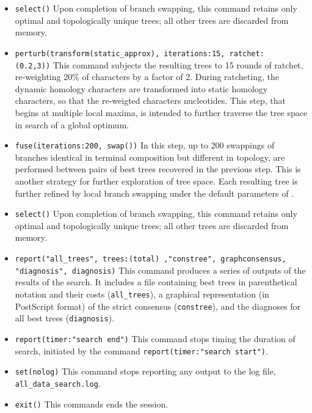 \begin{itemize}
\item \texttt{select()} Upon completion of branch swapping, this command retains only optimal and topologically unique trees; all other trees are discarded from memory. 
\item \texttt{perturb(transform(static\_approx), iterations:15, ratchet:\\(0.2,3))} This command subjects the resulting trees to 15 rounds of ratchet, re-weighting 20\% of characters by a factor of 2. During ratcheting, the dynamic homology characters are transformed into static homology characters, so that the re-weigted characters nucleotides. This step, that begins at multiple local maxima, is intended to further traverse the tree space in search of a global optimum.
\item \texttt{fuse(iterations:200, swap())} In this step, up to 200 swappings of branches identical in terminal composition but different in topology, are performed between pairs of best trees recovered in the previous step. This is another strategy for further exploration of tree space. Each resulting tree is further refined by local branch swapping under the default parameters of .
\item \texttt{select()} Upon completion of branch swapping, this command retains only optimal and topologically unique trees; all other trees are discarded from memory.
\item \texttt{report("all\_trees", trees:(total) ,"constree", graphconsensus, "diagnosis", diagnosis)} This command produces a series of outputs of the results of the search. It includes a file containing best trees in parenthetical notation and their costs (\texttt{all\_trees}), a graphical representation (in PostScript format) of the strict consensus (\texttt{constree}), and the diagnoses for all best trees (\texttt{diagnosis}).
\item \texttt{report(timer:"search end")} This command stops timing the duration of search, initiated by the command \texttt{report(timer:"search start")}.
\item \texttt{set(nolog)} This command stops reporting any output to the log file, \texttt{all\_data\_search.log}.
\item \texttt{exit()} This commands ends the \poy session.
\end{itemize}

